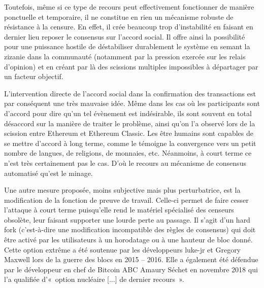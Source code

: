 Toutefois, même si ce type de recours peut effectivement fonctionner de manière ponctuelle et temporaire, il ne constitue en rien un mécanisme robuste de résistance à la censure. En effet, il crée beaucoup trop d'instabilité en faisant en dernier lieu reposer le consensus sur l'accord social. Il offre ainsi la possibilité pour une puissance hostile de déstabiliser durablement le système en semant la zizanie dans la communauté (notamment par la pression exercée sur les relais d'opinion) et en créant par là des scissions multiples impossibles à départager par un facteur objectif.

L'intervention directe de l'accord social dans la confirmation des transactions est par conséquent une très mauvaise idée. Même dans les cas où les participants sont d'accord pour dire qu'un tel évènement est indésirable, ils sont souvent en total désaccord sur la manière de traiter le problème, ainsi qu'on l'a observé lors de la scission entre Ethereum et Ethereum Classic. Les être humains sont capables de se mettre d'accord à long terme, comme le témoigne la convergence vers un petit nombre de langues, de religions, de monnaies, etc. Néanmoins, à court terme ce n'est très certainement pas le cas. D'où le recours au mécanisme de consensus automatisé qu'est le minage.


Une autre mesure proposée, moins subjective mais plus perturbatrice, est la modification de la fonction de preuve de travail. Celle-ci permet de faire cesser l'attaque à court terme puisqu'elle rend le matériel spécialisé des censeurs obsolète, leur faisant supporter une lourde perte au passage. Il s'agit d'un hard fork (c'est-à-dire une modification incompatible des règles de consensus) qui doit être activé par les utilisateurs à un horodatage ou à une hauteur de bloc donné. Cette option extrême a été soutenue par les développeurs luke-jr et Gregory Maxwell lors de la guerre des blocs en 2015 -- 2016. Elle a également été défendue par le développeur en chef de Bitcoin ABC Amaury Séchet en novembre 2018 qui l'a qualifiée d'«~option nucléaire [...] de dernier recours~».

